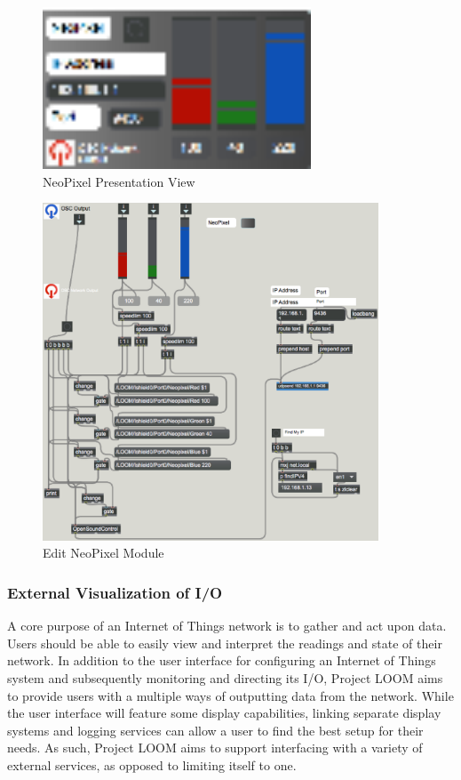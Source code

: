 \documentclass[onecolumn, draftclsnofoot,10pt, compsoc]{IEEEtran}
\begin{document}
    \begin{figure}[H]
        \centering
        \caption{NeoPixel Presentation View}
        \label{fig:neopixel_pres}
        \includegraphics[width=8cm]{neopixel_presentation.eps}         
     \end{figure}

     \begin{figure}[H]
        \centering
        \caption{Edit NeoPixel Module}
        \label{fig:neopixel_edit}
        \includegraphics[width=10cm]{neopixel_edit.eps}         
     \end{figure}


\subsubsection{External Visualization of I/O}
    A core purpose of an Internet of Things network is to gather and act upon data. Users should be able to easily view and interpret the readings and state of their network. In addition to the user interface for configuring an Internet of Things system and subsequently monitoring and directing its I/O, Project LOOM aims to provide users with a multiple ways of outputting data from the network. While the user interface will feature some display capabilities, linking separate display systems and logging services can allow a user to find the best setup for their needs. As such, Project LOOM aims to support interfacing with a variety of external services, as opposed to limiting itself to one.
\end{document}
